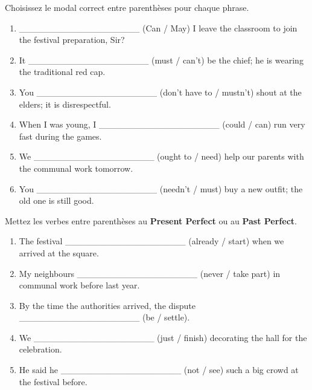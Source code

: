 \documentclass[11pt]{article}
\begin{document}
\begin{exercice}
Choisissez le modal correct entre parenthèses pour chaque phrase.
\begin{enumerate}
    \item \_\_\_\_\_\_\_\_\_\_\_\_\_\_\_\_\_\_\_ (Can / May) I leave the classroom to join the festival preparation, Sir?
    \item It \_\_\_\_\_\_\_\_\_\_\_\_\_\_\_\_\_\_\_ (must / can't) be the chief; he is wearing the traditional red cap.
    \item You \_\_\_\_\_\_\_\_\_\_\_\_\_\_\_\_\_\_\_ (don't have to / mustn't) shout at the elders; it is disrespectful.
    \item When I was young, I \_\_\_\_\_\_\_\_\_\_\_\_\_\_\_\_\_\_\_ (could / can) run very fast during the games.
    \item We \_\_\_\_\_\_\_\_\_\_\_\_\_\_\_\_\_\_\_ (ought to / need) help our parents with the communal work tomorrow.
    \item You \_\_\_\_\_\_\_\_\_\_\_\_\_\_\_\_\_\_\_ (needn't / must) buy a new outfit; the old one is still good.
\end{enumerate}
\end{exercice}

\begin{exercice}
Mettez les verbes entre parenthèses au \textbf{Present Perfect} ou au \textbf{Past Perfect}.
\begin{enumerate}
    \item The festival \_\_\_\_\_\_\_\_\_\_\_\_\_\_\_\_\_\_\_ (already / start) when we arrived at the square.
    \item My neighbours \_\_\_\_\_\_\_\_\_\_\_\_\_\_\_\_\_\_\_ (never / take part) in communal work before last year.
    \item By the time the authorities arrived, the dispute \_\_\_\_\_\_\_\_\_\_\_\_\_\_\_\_\_\_\_ (be / settle).
    \item We \_\_\_\_\_\_\_\_\_\_\_\_\_\_\_\_\_\_\_ (just / finish) decorating the hall for the celebration.
    \item He said he \_\_\_\_\_\_\_\_\_\_\_\_\_\_\_\_\_\_\_ (not / see) such a big crowd at the festival before.
\end{enumerate}
\end{exercice}
\end{document}
